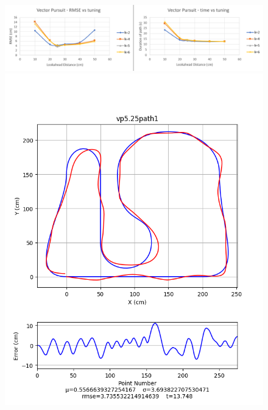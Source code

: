 \documentclass[mla8alt]{mla}
\begin{document}
\begin{paper}
\begin{figure}[H]
\includegraphics[width=\linewidth]{tuningGraphs/vp}
\includegraphics[width=\linewidth]{pathData/vppath1}
\endminipage\hfill
{}

\end{figure}
\end{paper}
\end{document}
